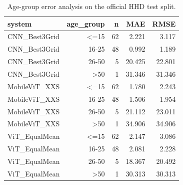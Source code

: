 \begin{table}[htbp]
\centering
\caption{Age-group error analysis on the official HHD test split.}
\label{tab:error-by-age-group}
\begin{tabular}{lrrrr}
\toprule
system & age\_group & n & MAE & RMSE \\
\midrule
CNN\_Best3Grid & <=15 & 62 & 2.221 & 3.117 \\
CNN\_Best3Grid & 16-25 & 48 & 0.992 & 1.189 \\
CNN\_Best3Grid & 26-50 & 5 & 20.425 & 22.801 \\
CNN\_Best3Grid & >50 & 1 & 31.346 & 31.346 \\
MobileViT\_XXS & <=15 & 62 & 1.780 & 2.243 \\
MobileViT\_XXS & 16-25 & 48 & 1.506 & 1.954 \\
MobileViT\_XXS & 26-50 & 5 & 21.112 & 23.011 \\
MobileViT\_XXS & >50 & 1 & 34.906 & 34.906 \\
ViT\_EqualMean & <=15 & 62 & 2.147 & 3.086 \\
ViT\_EqualMean & 16-25 & 48 & 2.081 & 2.228 \\
ViT\_EqualMean & 26-50 & 5 & 18.367 & 20.492 \\
ViT\_EqualMean & >50 & 1 & 30.313 & 30.313 \\
\bottomrule
\end{tabular}
\end{table}
